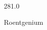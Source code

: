 \documentclass[12pt]{article}
\begin{document}
\hfill{}
\vfill
\begin{center}
  {\fontsize{50}{60}
  }

  \vspace{1em}

  281.0

Roentgenium
\end{center}
\vfill
\end{document}
